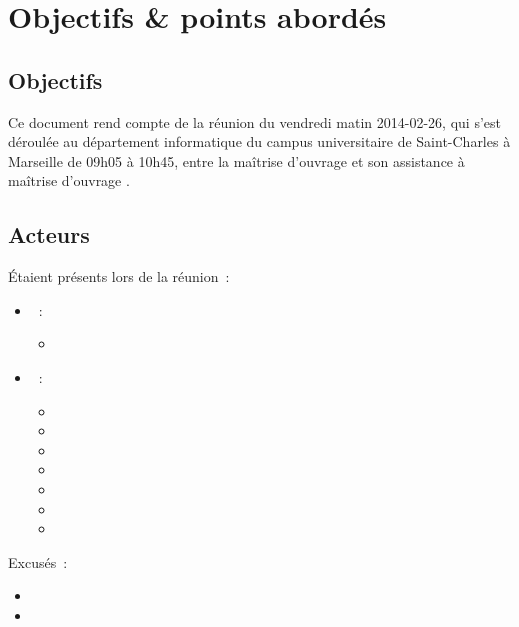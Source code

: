 \documentclass[11pt,fleqn]{report}
\begin{document}
\ZMakeCover


\chapter{Objectifs \& points abordés}

\section{Objectifs}
Ce document rend compte de la réunion du vendredi matin 2014-02-26, qui s'est déroulée au département informatique du campus universitaire de Saint-Charles à Marseille de 09h05 à 10h45, entre la maîtrise d'ouvrage \mo et son assistance à maîtrise d'ouvrage \amo.

\section{Acteurs}
Étaient présents lors de la réunion~:
\begin{itemize}
	\item \mo~:
	\begin{itemize}
		\item \Agopian
	\end{itemize}
	\item \amo~:
	\begin{itemize}
		\item \Cadon
		\item \Gairoard
		\item \Pachy
		\item \Julien
		\item \Mezelle
		\item \SuangaWeto
		\item \Toure
	\end{itemize}
\end{itemize}
Excusés~:
\begin{itemize}
	\item \Balde
	\item \Lericolais
\end{itemize}
\end{document}

